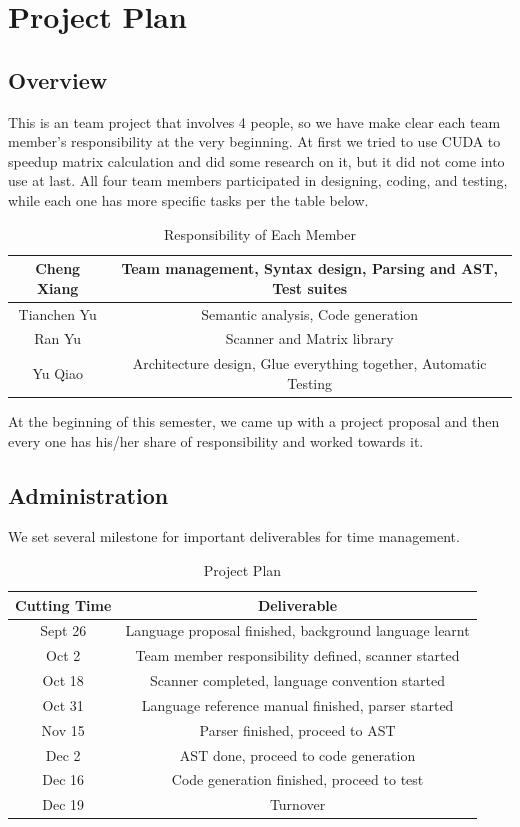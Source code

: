 \documentclass[12pt]{article} %
\begin{document}

\section{Project Plan}
\subsection{Overview}
This is an team project that involves 4 people, so we have make clear each team member's responsibility at the very beginning. At first we tried to use CUDA to speedup matrix calculation and did some research on it, but it did not come into use at last. All four team members participated in designing, coding, and testing, while each one has more specific tasks per the table below.

\begin{table}
\centering
\caption{Responsibility of Each Member}
\begin{tabular}{|c|c|} \hline
Cheng Xiang &   Team management, Syntax design, Parsing and AST, Test suites \\ \hline
Tianchen Yu &  Semantic analysis, Code generation  \\ \hline
Ran Yu & Scanner and Matrix library \\ \hline
Yu Qiao & Architecture design, Glue everything together, Automatic Testing \\ \hline 
\end{tabular}
\end{table}

At the beginning of this semester, we came up with a project proposal and then every one has his/her share of responsibility and worked towards it.   

\subsection{Administration}
We set several milestone for important deliverables for time management.

\begin{table}
\centering
\caption{Project Plan}
\begin{tabular}{|c|c|} \hline
Cutting Time & Deliverable \\ \hline
Sept 26 & Language proposal finished, background language learnt \\ \hline
Oct 2 & Team member responsibility defined, scanner started \\ \hline
Oct 18 & Scanner completed, language convention started \\ \hline
Oct 31 & Language reference manual finished, parser started \\ \hline
Nov 15 & Parser finished, proceed to AST \\ \hline
Dec 2 & AST done, proceed to code generation \\ \hline
Dec 16 & Code generation finished, proceed to test \\ \hline
Dec 19 & Turnover \\ \hline  
\end{tabular}
\end{table}
\end{document}
